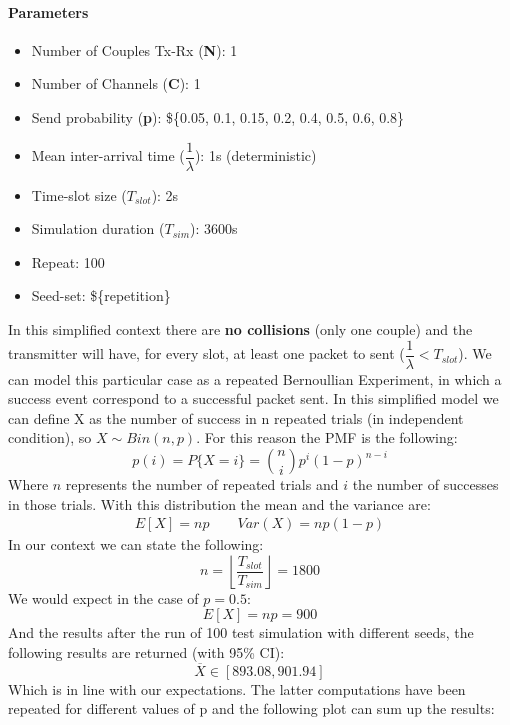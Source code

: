 \paragraph{Parameters}
\begin{itemize}
	\item Number of Couples Tx-Rx (\textbf{N}): 1
	\item Number of Channels (\textbf{C}): 1
	\item Send probability (\textbf{p}): \$\{0.05, 0.1, 0.15, 0.2, 0.4, 0.5, 0.6, 0.8\}
	\item Mean inter-arrival time ($\dfrac{1}{\lambda}$): 1s (deterministic)
	\item Time-slot size ($T_{slot}$): 2s 
	\item Simulation duration ($T_{sim}$): 3600s
	\item Repeat: 100
	\item Seed-set: \$\{repetition\}
\end{itemize}
In this simplified context there are \textbf{no collisions} (only one couple) and the transmitter will have, for every slot, at least one packet to sent ($\dfrac{1}{\lambda} < T_{slot}$). We can model this particular case as a repeated Bernoullian Experiment, in which a success event correspond to a successful packet sent. In this simplified model we can define X as the number of success in n repeated trials (in independent condition), so $X \sim Bin(n, p)$. For this reason the PMF is the following:
\begin{equation}
	p(i) = P\{X = i\} = \binom{n}{i} p^{i} (1-p)^{n-i}
\end{equation}
Where $n$ represents the number of repeated trials and $i$ the number of successes in those trials. With this distribution the mean and the variance are:
\begin{align*}
	E[X] = np \qquad     
	Var(X) = np(1-p)
\end{align*}
In our context we can state the following:
\begin{equation}
	n = \left \lfloor{\dfrac{T_{slot}}{T_{sim}}}\right \rfloor = 1800
\end{equation}
We would expect in the case of $p = 0.5$:
\begin{equation}
	E[X] = np = 900
\end{equation}
And the results after the run of 100 test simulation with different seeds, the following results are returned (with 95\% CI):
\begin{equation}
	\overline{X} \in [893.08, 901.94]
\end{equation}
Which is in line with our expectations. The latter computations have been repeated for different values of p and the following plot can sum up the results:

